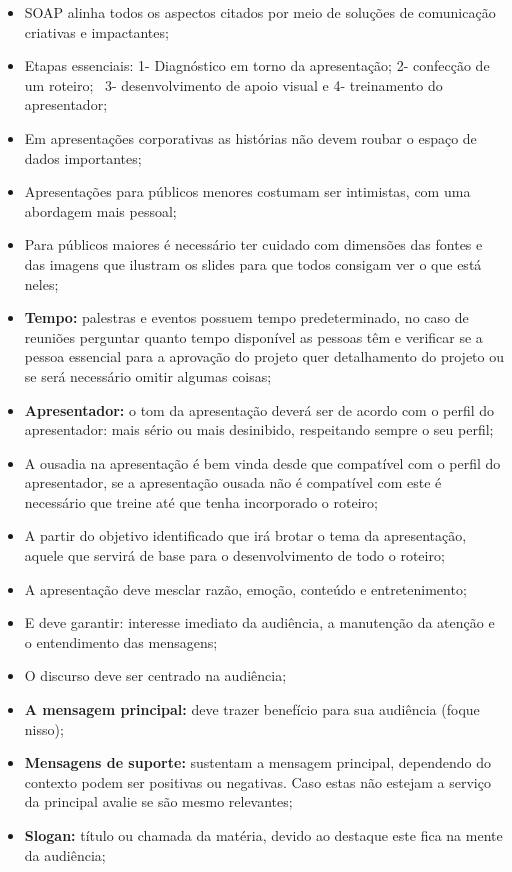 \begin{itemize}
    \item SOAP alinha todos os aspectos citados por meio de soluções de comunicação criativas e impactantes;
    \item Etapas essenciais: 1- Diagnóstico em torno da apresentação; 2- confecção de um roteiro;  3- desenvolvimento de apoio visual e 4- treinamento do apresentador;
    \item Em apresentações corporativas as histórias não devem roubar o espaço de dados importantes;
    \item Apresentações para públicos menores costumam ser intimistas, com uma abordagem mais pessoal;
    \item Para públicos maiores é necessário ter cuidado com dimensões das fontes e das imagens que ilustram os slides para que todos consigam ver o que está neles;
    \item \textbf{Tempo:} palestras e eventos possuem tempo predeterminado, no caso de reuniões perguntar quanto tempo disponível as pessoas têm e verificar se a pessoa essencial para a aprovação do projeto quer detalhamento do projeto ou se será necessário omitir algumas coisas;
    \item \textbf{Apresentador:} o tom da apresentação deverá ser de acordo com o perfil do apresentador: mais sério ou mais desinibido, respeitando sempre o seu perfil;
    \item A ousadia na apresentação é bem vinda desde que compatível com o perfil do apresentador, se a apresentação ousada não é compatível com este é necessário que treine até que tenha incorporado o roteiro;
    \item A partir do objetivo identificado que irá brotar o tema da apresentação, aquele que servirá de base para o desenvolvimento de todo o roteiro;
    \item A apresentação deve mesclar razão, emoção, conteúdo e entretenimento;
    \item E deve garantir: interesse imediato da audiência, a manutenção da atenção e o entendimento das mensagens;
    \item O discurso deve ser centrado na audiência;
    \item \textbf{A mensagem principal:} deve trazer benefício para sua audiência (foque nisso);
    \item \textbf{Mensagens de suporte:} sustentam a mensagem principal, dependendo do contexto podem ser positivas ou negativas. Caso estas não estejam a serviço da principal avalie se são mesmo relevantes;
    \item \textbf{Slogan:} título ou chamada da matéria, devido ao destaque este fica na mente da audiência;

\end{itemize}
